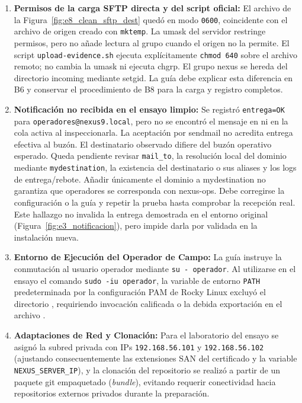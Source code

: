 \documentclass[10pt,a4paper]{article}
\begin{document}
\begin{enumerate}[leftmargin=*]
    \item \textbf{Permisos de la carga SFTP directa y del script oficial:} El archivo de la Figura~\ref{fig:e8_clean_sftp_dest} quedó en modo \texttt{0600}, coincidente con el archivo de origen creado con \texttt{mktemp}. La umask del servidor restringe permisos, pero no añade lectura al grupo cuando el origen no la permite. El script \texttt{upload-evidence.sh} ejecuta explícitamente \texttt{chmod 640} sobre el archivo remoto; no cambia la umask ni ejecuta chgrp. El grupo nexus se hereda del directorio incoming mediante setgid. La guía debe explicar esta diferencia en B6 y conservar el procedimiento de B8 para la carga y registro completos.
    \item \textbf{Notificación no recibida en el ensayo limpio:} Se registró \texttt{entrega=OK} para \texttt{operadores@nexus9.local}, pero no se encontró el mensaje en  ni en la cola activa al inspeccionarla. La aceptación por sendmail no acredita entrega efectiva al buzón. El destinatario observado difiere del buzón operativo esperado. Queda pendiente revisar \texttt{mail\_to}, la resolución local del dominio mediante \texttt{mydestination}, la existencia del destinatario o sus aliases y los logs de entrega/rebote. Añadir únicamente el dominio a mydestination no garantiza que operadores se corresponda con nexus-ops. Debe corregirse la configuración o la guía y repetir la prueba hasta comprobar la recepción real. Este hallazgo no invalida la entrega demostrada en el entorno original (Figura~\ref{fig:e3_notificacion}), pero impide darla por validada en la instalación nueva.
    \item \textbf{Entorno de Ejecución del Operador de Campo:} La guía instruye la conmutación al usuario operador mediante \texttt{su - operador}. Al utilizarse en el ensayo el comando \texttt{sudo -iu operador}, la variable de entorno \texttt{PATH} predeterminada por la configuración PAM de Rocky Linux excluyó el directorio , requiriendo invocación calificada o la debida exportación en el archivo .
    \item \textbf{Adaptaciones de Red y Clonación:} Para el laboratorio del ensayo se asignó la subred privada con IPs \texttt{192.168.56.101} y \texttt{192.168.56.102} (ajustando consecuentemente las extensiones SAN del certificado y la variable \texttt{NEXUS\_SERVER\_IP}), y la clonación del repositorio se realizó a partir de un paquete git empaquetado (\textit{bundle}), evitando requerir conectividad hacia repositorios externos privados durante la preparación.
\end{enumerate}
\end{document}
